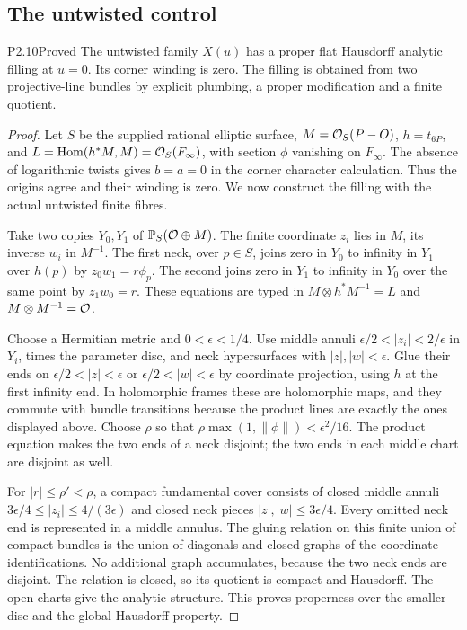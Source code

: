 \subsection{The untwisted control}
\begin{statement}{P2.10}{Proved}
The untwisted family $X(u)$ has a proper flat Hausdorff analytic filling at $u=0$. Its corner winding is zero. The filling is obtained from two projective-line bundles by explicit plumbing, a proper modification and a finite quotient.
\end{statement}
\begin{proof}
Let $S$ be the supplied rational elliptic surface, $M=\mathcal O_S(P-O)$, $h=t_{6P}$, and $L=\operatorname{Hom}(h^*M,M)=\mathcal O_S(F_\infty)$, with section $\phi$ vanishing on $F_\infty$. The absence of logarithmic twists gives $b=a=0$ in the corner character calculation. Thus the origins agree and their winding is zero. We now construct the filling with the actual untwisted finite fibres.

Take two copies $Y_0,Y_1$ of $\mathbb P_S(\mathcal O\oplus M)$. The finite coordinate $z_i$ lies in $M$, its inverse $w_i$ in $M^{-1}$. The first neck, over $p\in S$, joins zero in $Y_0$ to infinity in $Y_1$ over $h(p)$ by $z_0w_1=r\phi_p$. The second joins zero in $Y_1$ to infinity in $Y_0$ over the same point by $z_1w_0=r$. These equations are typed in $M\otimes h^*M^{-1}=L$ and $M\otimes M^{-1}=\mathcal O$.

Choose a Hermitian metric and $0<\epsilon<1/4$. Use middle annuli $\epsilon/2<|z_i|<2/\epsilon$ in $Y_i$, times the parameter disc, and neck hypersurfaces with $|z|,|w|<\epsilon$. Glue their ends on $\epsilon/2<|z|<\epsilon$ or $\epsilon/2<|w|<\epsilon$ by coordinate projection, using $h$ at the first infinity end. In holomorphic frames these are holomorphic maps, and they commute with bundle transitions because the product lines are exactly the ones displayed above. Choose $\rho$ so that $\rho\max(1,\|\phi\|)<\epsilon^2/16$. The product equation makes the two ends of a neck disjoint; the two ends in each middle chart are disjoint as well.

For $|r|\le\rho'<\rho$, a compact fundamental cover consists of closed middle annuli $3\epsilon/4\le|z_i|\le4/(3\epsilon)$ and closed neck pieces $|z|,|w|\le3\epsilon/4$. Every omitted neck end is represented in a middle annulus. The gluing relation on this finite union of compact bundles is the union of diagonals and closed graphs of the coordinate identifications. No additional graph accumulates, because the two neck ends are disjoint. The relation is closed, so its quotient is compact and Hausdorff. The open charts give the analytic structure. This proves properness over the smaller disc and the global Hausdorff property.


\end{proof}
